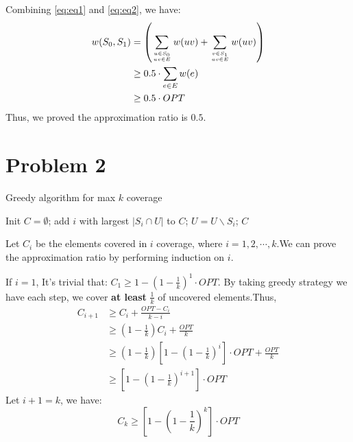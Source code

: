\documentclass[a4paper, 12pt, titlepage]{article}
\begin{document}
Combining \ref{eq:eq1} and \ref{eq:eq2}, we have:
\begin{equation}
    \begin{aligned}
        w(S_0, S_1) &= \left( \sum_{u \in S_0 \atop uv \in E} w(uv) + \sum_{v \in S_1 \atop uv \in E} w(uv) \right) \\
                    &\geq 0.5 \cdot \sum_{e \in E} w(e) \\
                    &\geq 0.5 \cdot OPT
    \end{aligned}
\end{equation}
Thus, we proved the approximation ratio is $0.5$.
\section{Problem 2}
\begin{algorithm}[h]
    \caption{Greedy algorithm for max $k$ coverage}
    \begin{algorithmic}[1]
        \State Init $C = \emptyset$;
 			\State add $i$ with largest $|S_{i} \cap U|$ to $C$;
 			\State $U = U \backslash S_{i}$;
        \EndWhile
        \State \Return $C$
    \end{algorithmic}
\end{algorithm}

Let $C_{i}$ be the elements covered in $i$ coverage, where $i = 1, 2, \cdots, k$.We can prove the approximation ratio by performing induction on $i$.

If $i = 1$, It's trivial that: $C_{1} \geq 1 - \left( 1 - \frac{1}{k} \right)^{1} \cdot OPT$.
By taking greedy strategy we have each step, we cover \textbf{at least} $\frac{1}{k}$ of uncovered elements.Thus,
\begin{equation}
	\begin{aligned}
		C_{i + 1} &\geq C_{i} + \frac{OPT - C_{i}}{k - i} \\
				  &\geq \left(1 - \frac{1}{k} \right) C_{i} + \frac{OPT}{k} \\
				  &\geq \left(1 - \frac{1}{k} \right)\left[ 1 - \left( 1 - \frac{1}{k} \right)^{i} \right] \cdot OPT + \frac{OPT}{k} \\
				  &\geq \left[ 1 - \left( 1- \frac{1}{k} \right)^{i + 1} \right] \cdot OPT
	\end{aligned}
\end{equation}
Let $i + 1 = k$, we have:
\[
	C_{k} \geq \left[ 1 - \left( 1 - \frac{1}{k} \right)^{k} \right] \cdot OPT
\]
\end{document}
